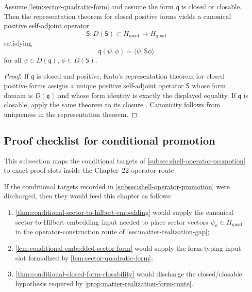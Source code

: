 \begin{proposition}
\label{prop:matter-realization-form-route}
Assume \cref{lem:sector-quadratic-form} and assume the form \(\mathfrak q\) is closed
or closable.
Then the representation theorem for closed positive forms yields a canonical
positive self-adjoint operator
\[
  \mathsf S:D(\mathsf S)\subset H_{\mathrm{quad}}\to H_{\mathrm{quad}}
\]
satisfying
\[
  \mathfrak q(\psi,\phi)=\langle\psi,\mathsf S\phi\rangle
\]
for all \(\psi\in D(\mathfrak q)\), \(\phi\in D(\mathsf S)\).
\end{proposition}

\begin{proof}
If \(\mathfrak q\) is closed and positive, Kato's representation theorem for
closed positive forms assigns
a unique positive self-adjoint operator \(\mathsf S\) whose form domain is
\(D(\mathfrak q)\) and whose form identity is exactly the displayed equality.
If \(\mathfrak q\) is closable, apply the same theorem to its closure
\cite{Kato1995}.
Canonicity follows from uniqueness in the representation theorem.
\end{proof}

\subsection{Proof checklist for conditional promotion}
\label{subsec:matter-realization-promotion-checklist}

This subsection maps the conditional targets of
\cref{subsec:shell-operator-promotion}
to exact proof slots inside the Chapter~22 operator route.

\begin{proposition}
\label{prop:matter-conditional-slot-map}
If the conditional targets recorded in
\cref{subsec:shell-operator-promotion}
were discharged, then they would feed this chapter as follows:
\begin{enumerate}[label=\textup{(\roman*)}]
\item
      \cref{thm:conditional-sector-to-hilbert-embedding}
      would supply the canonical sector-to-Hilbert embedding input needed
      to
      place sector vectors \(\psi_\sigma\in H_{\mathrm{quad}}\) in the
      operator-construction route of \cref{sec:matter-realization-gap};
\item
      \cref{lem:conditional-embedded-sector-form}
      would supply the form-typing input slot formalized by
      \cref{lem:sector-quadratic-form};
\item
      \cref{thm:conditional-closed-form-closability}
      would discharge the closed/closable hypothesis required by
      \cref{prop:matter-realization-form-route}.
\end{enumerate}
\end{proposition}

